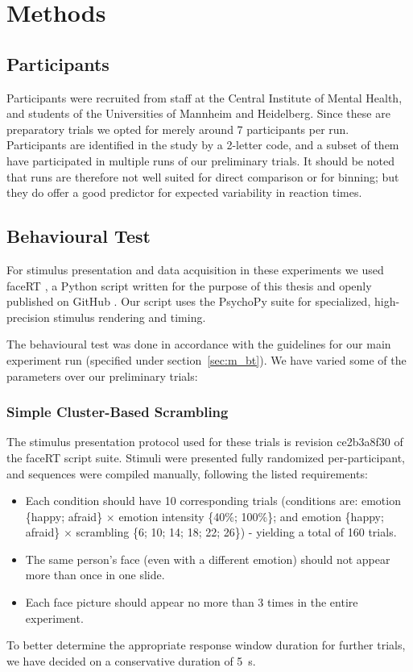     \section{Methods}
	\subsection{Participants}
	    Participants were recruited from staff at the Central Institute of Mental Health, and students of the Universities of Mannheim and Heidelberg.
	    Since these are preparatory trials we opted for merely around 7 participants per run.
	    Participants are identified in the study by a 2-letter code, and a subset of them have participated in multiple runs of our preliminary trials.
	    It should be noted that runs are therefore not well suited for direct comparison or for binning; but they do offer a good predictor for expected variability in reaction times.
	\subsection{Behavioural Test}
	    For stimulus presentation and data acquisition in these experiments we used faceRT \citep{faceRT}, a Python script written for the purpose of this thesis and openly published on GitHub \citep{github}.
	    Our script uses the PsychoPy suite \citep{Peirce2008} for specialized, high-precision stimulus rendering and timing.
	    
	    The behavioural test was done in accordance with the guidelines for our main experiment run (specified under section~\ref{sec:m_bt}).
	    We have varied some of the parameters over our preliminary trials:
	    \subsubsection{Simple Cluster-Based Scrambling}\label{sec:pe_m_bt_ss}
		The stimulus presentation protocol used for these trials is revision \textcolor{lg}{ce2b3a8f30} of the faceRT \citep{faceRT} script suite.
		Stimuli were presented fully randomized per-participant, and sequences were compiled manually, following the listed requirements:
		\begin{itemize}
		    \item Each condition should have 10 corresponding trials (conditions are: emotion \{happy; afraid\} $\times$ emotion intensity \{40\%; 100\%\}; and emotion \{happy; afraid\} $\times$ scrambling \{6; 10; 14; 18; 22; 26\}) - yielding a total of 160 trials.
		    \item The same person's face (even with a different emotion) should not appear more than once in one slide.
		    \item Each face picture should appear no more than 3 times in the entire experiment.
		\end{itemize}
		To better determine the appropriate response window duration for further trials, we have decided on a conservative duration of \SI{5}{\second}.
